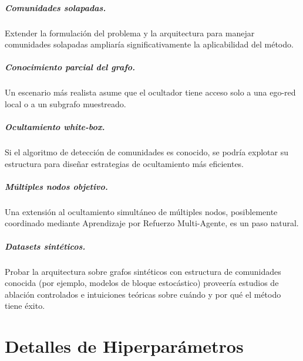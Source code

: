 \documentclass[11pt,a4paper,twoside]{tesis}
\begin{document}
\paragraph{Comunidades solapadas.}
Extender la formulación del problema y la arquitectura para manejar comunidades
solapadas ampliaría significativamente la aplicabilidad del método.

\paragraph{Conocimiento parcial del grafo.}
Un escenario más realista asume que el ocultador tiene acceso solo a una ego-red local
o a un subgrafo muestreado.

\paragraph{Ocultamiento white-box.}
Si el algoritmo de detección de comunidades es conocido, se podría explotar su
estructura para diseñar estrategias de ocultamiento más eficientes.

\paragraph{Múltiples nodos objetivo.}
Una extensión al ocultamiento simultáneo de múltiples nodos, posiblemente coordinado
mediante Aprendizaje por Refuerzo Multi-Agente, es un paso natural.

\paragraph{Datasets sintéticos.}
Probar la arquitectura sobre grafos sintéticos con estructura de comunidades conocida
(por ejemplo, modelos de bloque estocástico) proveería estudios de ablación controlados
e intuiciones teóricas sobre cuándo y por qué el método tiene éxito.


\backmatter

\printbibliography

\appendix

\chapter{Detalles de Hiperparámetros}
\label{app:hyperparams}
\end{document}
